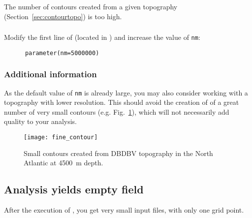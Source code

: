 \subsubsection{\question}

The number of contours created from a given topography (Section~\ref{sec:contourtopo}) is too high. 

\subsubsection{\answer}

Modify the first line of  (located in ) and increase the value of \texttt{nm}:
\begin{verbatim}
      parameter(nm=5000000)
\end{verbatim}

\subsubsection{Additional information}

As the default value of \texttt{nm} is already large, you may also consider working with a topography with lower resolution. This should avoid the creation of of a great number of very small contours (e.g. Fig.~\ref{fig:smallcont}), which will not necessarily add quality to your analysis.


\begin{figure}[htpb]
\centering
\parbox{.65\textwidth}{
\texttt{[image: fine\_contour]}
}\parbox{.35\textwidth}{
\caption[Small contours]{Small contours created from DBDBV topography in the North Atlantic at 4500~m depth\label{fig:smallcont}.}
}
\end{figure}
 


%





\subsection{Analysis yields empty field}


After the execution of , you get very small input files, with only one grid point.

